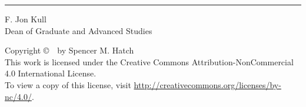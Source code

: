 \begin{titlepage}
\begin{minipage}[b]{\linewidth}
    \begin{flushleft}
        \vspace*{-0.44in}
        \singlespacing
        \begin{minipage}[b]{0.45\linewidth}
            \hrule \vspace{0.1in}
            F. Jon Kull \\              %
            Dean of Graduate and Advanced Studies
        \end{minipage}
    \end{flushleft}
    
 \end{minipage}
 
\end{titlepage}


\newpage
\thispagestyle{empty}
\begin{center}
    \vspace*{\fill}
    Copyright \copyright\ \the\year\ by Spencer M. Hatch \\ 
    This work is licensed under the Creative Commons Attribution-NonCommercial 4.0 International License. \\
    To view a copy of this license, visit \url{http://creativecommons.org/licenses/by-nc/4.0/}.
    \vspace*{\fill}
\end{center}

\newpage


\newpage
{}


{
    \newpage
    \hypersetup{linkcolor=black}
    \tableofcontents
    
    \newpage
    \listoftables

    \newpage
    \listoffigures
}

